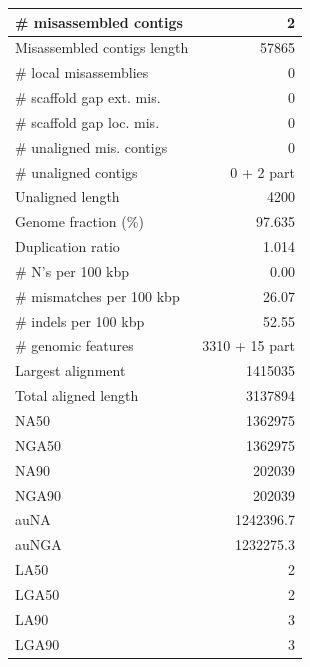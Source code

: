 \documentclass[12pt,a4paper]{article}
\begin{document}
\begin{table}[ht]
\begin{center}
\begin{tabular}{|l*{1}{|r}|}
\# misassembled contigs & 2 \\ \hline
Misassembled contigs length & 57865 \\ \hline
\# local misassemblies & 0 \\ \hline
\# scaffold gap ext. mis. & 0 \\ \hline
\# scaffold gap loc. mis. & 0 \\ \hline
\# unaligned mis. contigs & 0 \\ \hline
\# unaligned contigs & 0 + 2 part \\ \hline
Unaligned length & 4200 \\ \hline
Genome fraction (\%) & 97.635 \\ \hline
Duplication ratio & 1.014 \\ \hline
\# N's per 100 kbp & 0.00 \\ \hline
\# mismatches per 100 kbp & 26.07 \\ \hline
\# indels per 100 kbp & 52.55 \\ \hline
\# genomic features & 3310 + 15 part \\ \hline
Largest alignment & 1415035 \\ \hline
Total aligned length & 3137894 \\ \hline
NA50 & 1362975 \\ \hline
NGA50 & 1362975 \\ \hline
NA90 & 202039 \\ \hline
NGA90 & 202039 \\ \hline
auNA & 1242396.7 \\ \hline
auNGA & 1232275.3 \\ \hline
LA50 & 2 \\ \hline
LGA50 & 2 \\ \hline
LA90 & 3 \\ \hline
LGA90 & 3 \\ \hline
\end{tabular}
\end{center}
\end{table}
\end{document}
